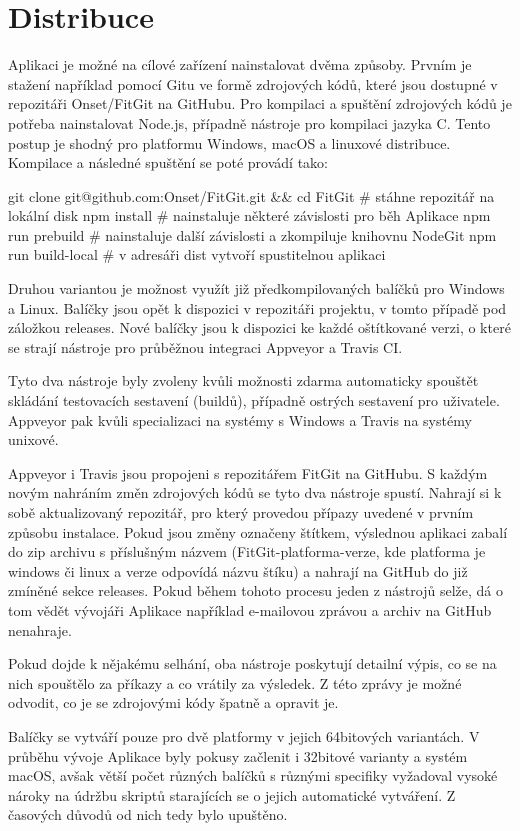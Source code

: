 \chapter{Distribuce}

Aplikaci je možné na cílové zařízení nainstalovat dvěma způsoby. Prvním je stažení například pomocí Gitu ve formě zdrojových kódů, které jsou dostupné v repozitáři Onset/FitGit na GitHubu. Pro kompilaci a spuštění zdrojových kódů je potřeba nainstalovat Node.js, případně nástroje pro kompilaci jazyka C. Tento postup je shodný pro platformu Windows, macOS a linuxové distribuce. Kompilace a následné spuštění se poté provádí tako:

git clone git@github.com:Onset/FitGit.git \&\& cd FitGit \# stáhne repozitář na lokální disk
npm install \# nainstaluje některé závislosti pro běh Aplikace
npm run prebuild \# nainstaluje další závislosti a zkompiluje knihovnu NodeGit
npm run build-local \# v adresáři dist vytvoří spustitelnou aplikaci

Druhou variantou je možnost využít již předkompilovaných balíčků pro Windows a Linux. Balíčky jsou opět k dispozici v repozitáři projektu, v tomto případě pod záložkou releases. Nové balíčky jsou k dispozici ke každé oštítkované verzi, o které se strají nástroje pro průběžnou integraci Appveyor a Travis CI.

Tyto dva nástroje byly zvoleny kvůli možnosti zdarma automaticky spouštět skládání testovacích sestavení (buildů), případně ostrých sestavení pro uživatele. Appveyor pak kvůli specializaci na systémy s Windows a Travis na systémy unixové.

Appveyor i Travis jsou propojeni s repozitářem FitGit na GitHubu. S každým novým nahráním změn zdrojových kódů se tyto dva nástroje spustí. Nahrají si k sobě aktualizovaný repozitář, pro který provedou přípazy uvedené v prvním způsobu instalace. Pokud jsou změny označeny štítkem, výslednou aplikaci zabalí do zip archivu s příslušným názvem (FitGit-platforma-verze, kde platforma je windows či linux a verze odpovídá názvu štíku) a nahrají na GitHub do již zmíněné sekce releases. Pokud během tohoto procesu jeden z nástrojů selže, dá o tom vědět vývojáři Aplikace například e-mailovou zprávou a archiv na GitHub nenahraje.

Pokud dojde k nějakému selhání, oba nástroje poskytují detailní výpis, co se na nich spouštělo za příkazy a co vrátily za výsledek. Z této zprávy je možné odvodit, co je se zdrojovými kódy špatně a opravit je.

Balíčky se vytváří pouze pro dvě platformy v jejich 64bitových variantách. V průběhu vývoje Aplikace byly pokusy začlenit i 32bitové varianty a systém macOS, avšak větší počet různých balíčků s různými specifiky vyžadoval vysoké nároky na údržbu skriptů starajících se o jejich automatické vytváření. Z časových důvodů od nich tedy bylo upuštěno.
